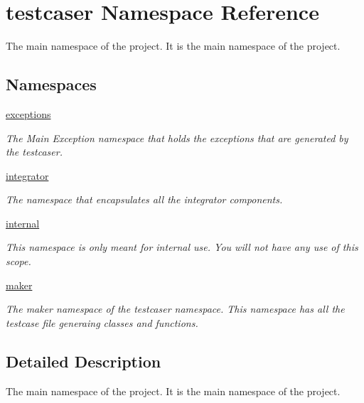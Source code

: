 \hypertarget{namespacetestcaser}{}\section{testcaser Namespace Reference}
\label{namespacetestcaser}


The main namespace of the project. It is the main namespace of the project.  


\subsection*{Namespaces}
\begin{DoxyCompactItemize}
\item 
 \hyperlink{namespacetestcaser_1_1exceptions}{exceptions}
\begin{DoxyCompactList}\small\item\em The Main Exception namespace that holds the exceptions that are generated by the testcaser. \end{DoxyCompactList}\item 
 \hyperlink{namespacetestcaser_1_1integrator}{integrator}
\begin{DoxyCompactList}\small\item\em The namespace that encapsulates all the integrator components. \end{DoxyCompactList}\item 
 \hyperlink{namespacetestcaser_1_1internal}{internal}
\begin{DoxyCompactList}\small\item\em This namespace is only meant for internal use. You will not have any use of this scope. \end{DoxyCompactList}\item 
 \hyperlink{namespacetestcaser_1_1maker}{maker}
\begin{DoxyCompactList}\small\item\em The maker namespace of the testcaser namespace. This namespace has all the testcase file generaing classes and functions. \end{DoxyCompactList}\end{DoxyCompactItemize}


\subsection{Detailed Description}
The main namespace of the project. It is the main namespace of the project. 

